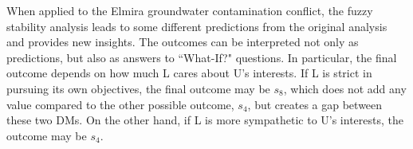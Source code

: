When applied to the Elmira groundwater contamination conflict, the fuzzy stability analysis leads to some different predictions from the original analysis and provides new insights. The outcomes can be interpreted not only as predictions, but also as answers to ``What-If?" questions. In particular, the final outcome depends on how much L cares about U's interests. If L is strict in pursuing its own objectives, the final outcome may be $s_8$, which does not add any value compared to the other possible outcome, $s_4$, but creates a gap between these two DMs. On the other hand, if L is more sympathetic to U's interests, the outcome may be $s_4$.





